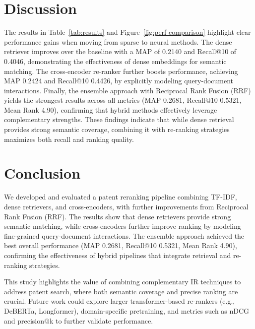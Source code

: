 \documentclass[11pt,a4paper]{article}
\begin{document}
\section{Discussion}
The results in Table~\ref{tab:results} and Figure~\ref{fig:perf-comparison} highlight clear performance gains when moving from sparse to neural methods. 
The dense retriever improves over the baseline with a MAP of 0.2140 and Recall@10 of 0.4046, demonstrating the effectiveness of dense embeddings for semantic matching. 
The cross-encoder re-ranker further boosts performance, achieving MAP 0.2424 and Recall@10 0.4426, by explicitly modeling query-document interactions. 
Finally, the ensemble approach with Reciprocal Rank Fusion (RRF) yields the strongest results across all metrics (MAP 0.2681, Recall@10 0.5321, Mean Rank 4.90), confirming that hybrid methods effectively leverage complementary strengths. 
These findings indicate that while dense retrieval provides strong semantic coverage, combining it with re-ranking strategies maximizes both recall and ranking quality.
 
\section{Conclusion}
We developed and evaluated a patent reranking pipeline combining TF-IDF, dense retrievers, and cross-encoders, with further improvements from Reciprocal Rank Fusion (RRF). 
The results show that dense retrievers provide strong semantic matching, while cross-encoders further improve ranking by modeling fine-grained query-document interactions. 
The ensemble approach achieved the best overall performance (MAP 0.2681, Recall@10 0.5321, Mean Rank 4.90), confirming the effectiveness of hybrid pipelines that integrate retrieval and re-ranking strategies. 

This study highlights the value of combining complementary IR techniques to address patent search, where both semantic coverage and precise ranking are crucial. 
Future work could explore larger transformer-based re-rankers (e.g., DeBERTa, Longformer), domain-specific pretraining, and metrics such as nDCG and precision@k to further validate performance.



\end{document}
